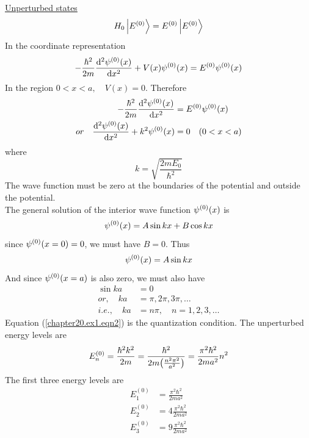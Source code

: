 \begin{enumerate}[label=Problem.\arabic*,start=1]
			\underline{Unperturbed states}
			\begin{equation*}
				H_0 \ket{E^{(0)}} = E^{(0)} \ket{E^{(0)}}
			\end{equation*}
			In the coordinate representation
			\begin{equation*}
				-\frac{\hbar^2}{2 m} \dv[2]{\psi^{(0)}\qty(x)}{x} + V\qty(x) \psi^{(0)}\qty(x) = E^{(0)} \psi^{(0)}\qty(x)
			\end{equation*}
			In the region $0 < x < a,\quad V(x) = 0$. Therefore
			\begin{align}
				-\frac{\hbar^2}{2 m} \dv[2]{\psi^{(0)}\qty(x)}{x} 
				&= E^{(0)} \psi^{(0)}\qty(x) \nonumber\\
		or\quad		\dv[2]{\psi^{(0)}\qty(x)}{x} + k^2 \psi^{(0)}\qty(x) &= 0 \quad (0 < x < a)
			\label{chapter20.ex1.eqn1}
			\end{align}
			where
			\begin{equation*}
				k = \sqrt{\frac{2 m E_0}{\hbar^2}}
			\end{equation*}
			The wave function must be zero at the boundaries of the potential and outside the potential.\\
			
			The general solution of the interior wave function $\psi^{(0)}\qty(x)$ is
			\begin{equation*}
				\psi^{(0)}\qty(x) = A \sin k x + B \cos k x
			\end{equation*}
			since $\psi^{(0)}\qty(x=0)=0$, we must have $B=0$. Thus
			\begin{equation*}
				\psi^{(0)}\qty(x) = A \sin k x 
			\end{equation*}
			And since $\psi^{(0)}\qty(x=a)$ is also zero, we must also have
			\begin{align}
				\sin k a &= 0 \nonumber\\
				or, \quad k a &= \pi, 2\pi, 3\pi, \ldots \nonumber\\
				i.e.,\quad k a &= n \pi, \quad n = 1,2,3,\ldots
				\label{chapter20.ex1.eqn2}
			\end{align}
			Equation (\ref{chapter20.ex1.eqn2}) is the quantization condition. The unperturbed energy levels are
			\begin{equation}
				E^{(0)}_n = \frac{\hbar^2 k^2}{2 m} = \frac{\hbar^2}{2 m \qty(\frac{n^2 \pi^2}{a^2})} = \frac{\pi^2 \hbar^2}{2 m a^2} n^2
				\label{chapter20.ex1.eqn3}
			\end{equation}
			The first three energy levels are
			\begin{align*}
				E_1^{(0)} &= \frac{\pi^2 \hbar^2}{2 m a^2} \\
				E_2^{(0)} &= 4 \frac{\pi^2 \hbar^2}{2 m a^2} \\
				E_3^{(0)} &= 9 \frac{\pi^2 \hbar^2}{2 m a^2}
			\end{align*}
			

\end{enumerate}
